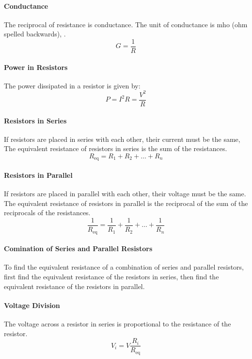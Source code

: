 \documentclass[11pt]{report}
\begin{document}
\paragraph{Conductance} The reciprocal of resistance is conductance. The unit of conductance is mho (ohm spelled backwards), .
\begin{equation}
    G = \frac{1}{R}
\end{equation}
\paragraph{Power in Resistors} The power dissipated in a resistor is given by:
\begin{equation}
    P = I^2R = \frac{V^2}{R}
\end{equation}
\paragraph{Resistors in Series} If resistors are placed in series with each other, their current must be the same, The equivalent resistance of resistors in series is the sum of the resistances.
\begin{equation}
    R_{\text{eq}} = R_1 + R_2 + \dots + R_n
\end{equation}
\paragraph{Resistors in Parallel} If resistors are placed in parallel with each other, their voltage must be the same. The equivalent resistance of resistors in parallel is the reciprocal of the sum of the reciprocals of the resistances.
\begin{equation}
    \frac{1}{R_{\text{eq}}} = \frac{1}{R_1} + \frac{1}{R_2} + \dots + \frac{1}{R_n}
\end{equation}
\paragraph{Comination of Series and Parallel Resistors} To find the equivalent resistance of a combination of series and parallel resistors, first find the equivalent resistance of the resistors in series, then find the equivalent resistance of the resistors in parallel.
\paragraph{Voltage Division} The voltage across a resistor in series is proportional to the resistance of the resistor.
\begin{equation}
    V_i = V \frac{R_i}{R_{\text{eq}}}
\end{equation}
\end{document}
